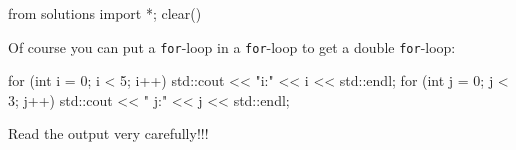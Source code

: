 \begin{python0}
from solutions import *; clear()
\end{python0}

Of course you can put a \texttt{for}-loop in a \texttt{for}-loop to get a double \texttt{for}-loop:
\begin{console}
for (int i = 0; i < 5; i++)
{   
    std::cout << "i:" << i << std::endl;
    for (int j = 0; j < 3; j++)
    {   
        std::cout << " j:" << j << std::endl;
    }
}
\end{console}
Read the output very carefully!!!




